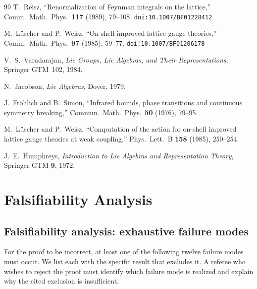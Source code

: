 \documentclass[11pt]{article}
\theoremstyle{definition}
\begin{document}
\begin{thebibliography}{99}
 T.~Reisz,
  ``Renormalization of Feynman integrals on the lattice,''
  Comm.\ Math.\ Phys.\ \textbf{117} (1989), 79--108.
  \texttt{doi:10.1007/BF01228412}

 M.~L\"uscher and P.~Weisz,
  ``On-shell improved lattice gauge theories,''
  Comm.\ Math.\ Phys.\ \textbf{97} (1985), 59--77.
  \texttt{doi:10.1007/BF01206178}

 V.~S.~Varadarajan,
  \emph{Lie Groups, Lie Algebras, and Their
  Representations},
  Springer GTM~102, 1984.

 N.~Jacobson,
  \emph{Lie Algebras},
  Dover, 1979.

 J.~Fr\"ohlich and B.~Simon,
  ``Infrared bounds, phase transitions and continuous
  symmetry breaking,''
  Commun.\ Math.\ Phys.\ \textbf{50} (1976), 79--95.

 M.~L\"uscher and P.~Weisz,
  ``Computation of the action for on-shell improved
  lattice gauge theories at weak coupling,''
  Phys.\ Lett.\ B \textbf{158} (1985), 250--254.

 J.~E.~Humphreys,
  \emph{Introduction to Lie Algebras and Representation
  Theory}, Springer GTM \textbf{9}, 1972.


\end{thebibliography}
\section{Falsifiability Analysis}\label{app:falsify}

\subsection{Falsifiability analysis: exhaustive failure modes}%
\label{subsec:falsify}

For the proof to be incorrect, at least one of the following
twelve failure modes must occur.  We list each with the
specific result that excludes it.  A referee who wishes to
reject the proof must identify which failure mode is realized
and explain why the cited exclusion is insufficient.
\end{document}
